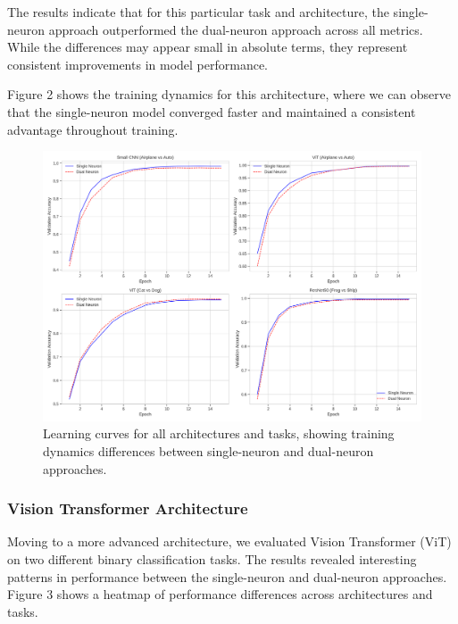 \documentclass[11pt]{article}
\begin{document}
The results indicate that for this particular task and architecture, the single-neuron approach outperformed the dual-neuron approach across all metrics. While the differences may appear small in absolute terms, they represent consistent improvements in model performance.

Figure 2 shows the training dynamics for this architecture, where we can observe that the single-neuron model converged faster and maintained a consistent advantage throughout training.

\begin{figure}[htbp]
\centering
\includegraphics[width=\textwidth]{figures/learning_curves.png}
\caption{Learning curves for all architectures and tasks, showing training dynamics differences between single-neuron and dual-neuron approaches.}
\end{figure}

\subsubsection{Vision Transformer Architecture}
Moving to a more advanced architecture, we evaluated Vision Transformer (ViT) on two different binary classification tasks. The results revealed interesting patterns in performance between the single-neuron and dual-neuron approaches. Figure 3 shows a heatmap of performance differences across architectures and tasks.
\end{document}
